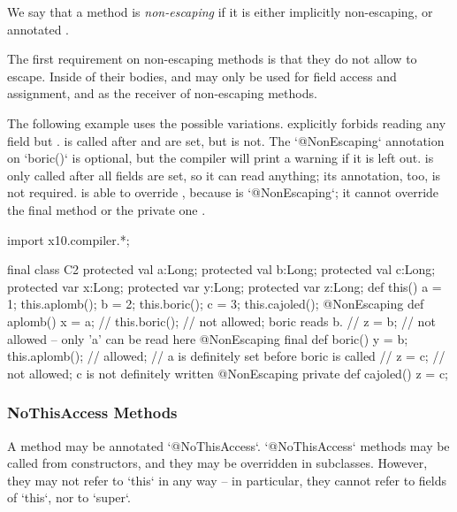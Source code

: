We say that a method is {\em non-escaping} if it is either implicitly
non-escaping, or annotated .

The first requirement on non-escaping methods is that they do not allow
 to escape. Inside of their bodies,  and  may
only be used for field access and assignment, and as the receiver of
non-escaping methods.


The following example uses the possible variations.   
explicitly forbids reading any field but
.  is called after  and  are set, but
 is not.
The \xcd`@NonEscaping` annotation on \xcd`boric()` is optional, but the
compiler will print a warning if it is left out.
 is only called after all fields are set, so it
can read anything; its annotation, too, is not required.    is able to override , because
 is \xcd`@NonEscaping`; it cannot override the final method
 or the private one .  
\begin{xten}
import x10.compiler.*;

final class C2 {
  protected val a:Long; protected val b:Long; protected val c:Long;
  protected var x:Long; protected var y:Long; protected var z:Long;
  def this() {
    a = 1;
    this.aplomb();
    b = 2;
    this.boric();
    c = 3;
    this.cajoled();
  }
  @NonEscaping def aplomb() {
    x = a;
    // this.boric(); // not allowed; boric reads b.
    // z = b; // not allowed -- only 'a' can be read here
  }
  @NonEscaping final def boric() {
    y = b;
    this.aplomb(); // allowed; 
       // a is definitely set before boric is called
    // z = c; // not allowed; c is not definitely written
  }
  @NonEscaping private def cajoled() {
    z = c;
  }
}

\end{xten}
%

\subsubsection{NoThisAccess Methods}

A method may be annotated \xcd`@NoThisAccess`.  \xcd`@NoThisAccess` methods
may be called from constructors, and they may be overridden in subclasses.
However, they may not refer to \xcd`this` in any way -- in particular, they
cannot refer to fields of \xcd`this`, nor to \xcd`super`.

